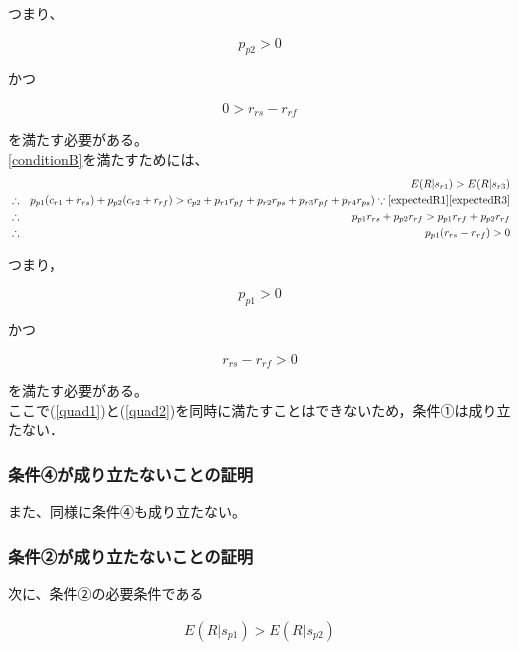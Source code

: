 つまり、

\begin{equation}
  p_{p2} > 0 \nonumber
\end{equation}

かつ

\begin{equation}
\label{quad1}
  0 > r_{rs} - r_{rf}
\end{equation}

を満たす必要がある。\\


\eqref{conditionB}を満たすためには、
\begin{eqnarray*}
  &&E(R|s_{r1}) > E(R|s_{r3}) \\
  &\therefore& p_{p1} (c_{r1} + r_{rs}) + p_{p2} (c_{r2} + r_{rf}) > c_{p2} + p_{r1} r_{pf} + p_{r2} r_{ps} + p_{r3} r_{pf} + p_{r4} r_{ps}) \because\eqref{expectedR1}\eqref{expectedR3}\\
  &\therefore& p_{p1} r_{rs} + p_{p2} r_{rf} > p_{p1} r_{rf} + p_{p2} r_{rf} \\
  &\therefore& p_{p1} (r_{rs} - r_{rf}) > 0
\end{eqnarray*}

つまり，

\begin{equation}
   p_{p1} > 0 \nonumber
\end{equation}

かつ

\begin{equation}
   \label{quad2}
   r_{rs} - r_{rf} > 0
\end{equation}

を満たす必要がある。\\

ここで(\ref{quad1})と(\ref{quad2})を同時に満たすことはできないため，条件①は成り立たない．\\

\subsubsection{条件④が成り立たないことの証明}
また、同様に条件④も成り立たない。

\subsubsection{条件②が成り立たないことの証明}
次に、条件②の必要条件である

\begin{gather}
  E(R |s_{p1}) > E(R |s_{p2}) \label{conditionC}
\end{gather}

